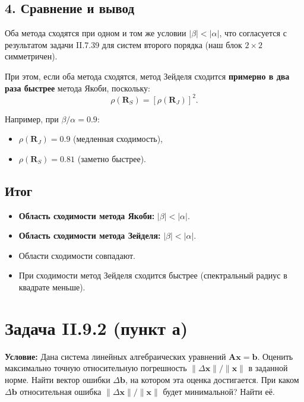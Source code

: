 \documentclass{article}
\begin{document}
\subsection*{4. Сравнение и вывод}

Оба метода сходятся при одном и том же условии $|\beta| < |\alpha|$, что согласуется с результатом задачи II.7.39 для систем второго порядка (наш блок $2\times 2$ симметричен).

При этом, если оба метода сходятся, метод Зейделя сходится \textbf{примерно в два раза быстрее} метода Якоби, поскольку:
\begin{equation}
\rho(\mathbf{R}_S) = [\rho(\mathbf{R}_J)]^2.
\end{equation}

Например, при $\beta/\alpha = 0.9$:
\begin{itemize}
\item $\rho(\mathbf{R}_J) = 0.9$ (медленная сходимость),
\item $\rho(\mathbf{R}_S) = 0.81$ (заметно быстрее).
\end{itemize}

\subsection*{Итог}

\begin{itemize}
\item \textbf{Область сходимости метода Якоби:} $|\beta| < |\alpha|$.
\item \textbf{Область сходимости метода Зейделя:} $|\beta| < |\alpha|$.
\item Области сходимости совпадают.
\item При сходимости метод Зейделя сходится быстрее (спектральный радиус в квадрате меньше).
\end{itemize}

















\section*{Задача II.9.2 (пункт а)}

\textbf{Условие:} Дана система линейных алгебраических уравнений $\mathbf{A}\mathbf{x} = \mathbf{b}$. Оценить максимально точную относительную погрешность $\|\Delta\mathbf{x}\|/\|\mathbf{x}\|$ в заданной норме. Найти вектор ошибки $\Delta\mathbf{b}$, на котором эта оценка достигается. При каком $\Delta\mathbf{b}$ относительная ошибка $\|\Delta\mathbf{x}\|/\|\mathbf{x}\|$ будет минимальной? Найти её.
\end{document}
